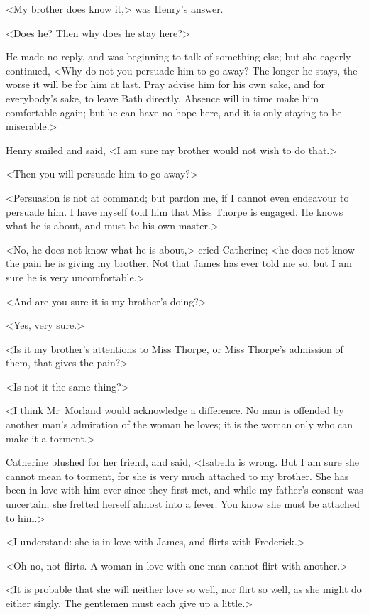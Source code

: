  <My brother does know it,> was Henry's answer. 

 <Does he? Then why does he stay here?> 

 He made no reply, and was beginning to talk of something else; but she eagerly continued, <Why do not you persuade him to go away? The longer he stays, the worse it will be for him at last. Pray advise him for his own sake, and for everybody's sake, to leave Bath directly. Absence will in time make him comfortable again; but he can have no hope here, and it is only staying to be miserable.> 

 Henry smiled and said, <I am sure my brother would not wish to do that.> 

 <Then you will persuade him to go away?> 

 <Persuasion is not at command; but pardon me, if I cannot even endeavour to persuade him. I have myself told him that Miss Thorpe is engaged. He knows what he is about, and must be his own master.> 

 <No, he does not know what he is about,> cried Catherine; <he does not know the pain he is giving my brother. Not that James has ever told me so, but I am sure he is very uncomfortable.> 

 <And are you sure it is my brother's doing?> 

 <Yes, very sure.> 

 <Is it my brother's attentions to Miss Thorpe, or Miss Thorpe's admission of them, that gives the pain?> 

 <Is not it the same thing?> 

 <I think Mr~Morland would acknowledge a difference. No man is offended by another man's admiration of the woman he loves; it is the woman only who can make it a torment.> 

 Catherine blushed for her friend, and said, <Isabella is wrong. But I am sure she cannot mean to torment, for she is very much attached to my brother. She has been in love with him ever since they first met, and while my father's consent was uncertain, she fretted herself almost into a fever. You know she must be attached to him.> 

 <I understand: she is in love with James, and flirts with Frederick.> 

 <Oh no, not flirts. A woman in love with one man cannot flirt with another.> 

 <It is probable that she will neither love so well, nor flirt so well, as she might do either singly. The gentlemen must each give up a little.> 

